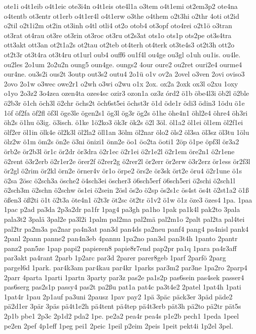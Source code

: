{ote1i
o4t1eib
o4t1eic
ote3i4n
o4t1eis
ote4l1a
o3tem
o4t1emi
ot2em3p2
ote4na
o4tentb
ot3entr
ot1erb
o4t1er4l
o4t1erw
o3the
o4them
o2t3hi
o2thr
4oti
ot2id
o2til
o2t1i2m
ot2in
ot3inh
o4tl
otli4
ot2o
otob4
ot3opf
oto4rei
o2t1ö
o3tran
ot3rat
ot4rau
ot3re
ot3rin
ot3roc
ot3ru
ot2s3at
ots1o
ots1p
ots2pe
ot3s4tra
ott3akt
ott3an
ot2t1a2s
ot2tau
ot2teb
ot4terh
ot4terk
ot3te4s3
ot2t3h
ott2o
ot2t3r
ot3t4ra
ot3t4ru
ot1url
oub4
ouff6
ou1f4l
ou4ge
ou3gl
o1uh
ou1is.
ou4le.
ou2les
2o1um
2o2u2n
oung5
oun4ge.
oungs2
4our
oure2
ou2ret
ouri2e4
ourme4
our4ne.
ou3s2i
ous2t
3outp
out3s2
outu4
2o1ü
o1v
ov2a
2ovel
o3ven
2ovi
oviso3
2ovo
2o1w
o3wec
owe2r1
o2wh
o3wi
o2wu
o1x
2ox.
ox2a
2oxk
ox3l
o2xu
1oxy
o1yo
2o3z2
3o4zea
ozen4ta
ozes4sc
ozir3
ozon1a
oz3z
órd2
ö1b
öbe4l3i
öb2l
ö2ble
ö2b3r
ö1ch
öch3l
ö2chr
öchs2t
öch6st5ei
öchst3r
ö1d
öde1r
ödi3
ödin3
1ödu
ö1e
1öf
öf2fa
öf2fl
öf3l
öge3le
ögen2s1
ög3l
ög3r
ög2s
ö1he
öhe4n1
öhl2e4
öhre4
öh3ri
öh2s
ö1hu
ö3ig.
ö3isch.
ö1ke
1ö2ko3
ök3r
ök2s
ö2l
3öl.
öl1a2
öl1ei
öl1em
öl2f1ei
ölf2er
öl1in
ölk4e
öl2k3l
öl2la2
öll1an
3ölm
öl2nar
ölo2
öls2
öl3sa
öl3sz
öl3tu
1ölu
ölz2w
ö1m
öm2s
ön2e
ö3ni
önizi1
önn2e
öo1
öo2ta
öoti1
2öp
ö1pe
öpf3l
ör3a2
örb2e
ör2b3l
ör1c
ör2dr
ör3dra
ö2r1ec
ö2r1ei
ö2r1e2l
ö2r1em
öre2n1
ö2r1ene
ö2rent
ö3r2erb
ö2r1er2e
örer2f
ö2rer2g
ö2rer2l
ör2err
ör2erw
ö3r2erz
ör1ess
ör2f3l
ör2gl
ö2rim
ör2kl
örn2e
örner4v
ör1o
örpe2
örs2e
ör3sk
ört2e
öru4
ö2r1une
ö1s
ö2sa
2ösc
ö2sch3a
ösche2
ö4sch3ei
öscher3
ö6sch5erf
ö6sch5eri
ö2schi
ö2sch1l
ö2sch3m
ö2schn
ö2schw
ös1ei
ö2sein
2ösl
ös2o
ö2sp
ös2s1c
ös4st
ös4t
ö2st1a2
ö1ß
ößen3
öß2ti
ö1t
ö2t3a
öte4n1
ö2t3r
öt2sc
öt2tr
ö1v2
ö1w
ö1z
öze3
özes4
1pa.
1paa
1pac
p2ad
pa3da
2p3a2dr
pa1fr
1pag4
pa3gh
pa1ho
1pak
pa1k4l
pak2to
3pala
pala3t2
3palä
3pal2e
pa3l2i
1palm
pal2ma
pal2mä
pal2m1o
2palt
pal2ta
pal4tei
pal2tr
pa2m3a
pa2nar
pa4n3at
pan3d
pan4ds
pa2neu
panf4
pang4
pa4nisl
pank4
2panl
2pann
panne2
pan4n3eb
4pannu
1pa2no
pan3sl
pan3t4h
1panto
2pantr
panz2
pan5ze
1pap
papi2
papieren8
papie8r7end
pap2pr
pa1q
1para
pa4r3aff
par3akt
pa4rant
2parb
1p2arc
par3d
2parer
parer8geb
1parf
2parfö
2parg
pargel6d
1park.
par4k3am
par4kau
par4kr
1parks
par3m2
par3ne
1pa2ro
2parp4
2parr
4parta
1parti
1partn
3party
par3z
pas2e
pa1s2p
pas6sein
pas4sek
passer4
pas6serg
pas2s1p
passy4
pas2t
pa2ßu
pat1a
pat4c
pa3t4e2
2patel
1pat4h
1pati
1pat4r
1pau
2p1auf
pa3uni
2pausz
1pav
pay2
1pä
3päc
päck3er
3päd
päde2
pä2d1er
3pär
3päs
pä4t1e2h
pä4tent
pä4tep
pä4t3erb
pät3h
pä2to
pä2tr
pät5s
2p1b
pbe1
2p3c
2p1d2
pda2
1pe.
pe2a2
pea4r
pea4s
p1e2b
pech1
1peda
1peel
pe2en
2pef
4p1eff
1peg
pei1
2peic
1peil
p2eim
2peis
1peit
pekt4i
1p2el
3pel.
}
